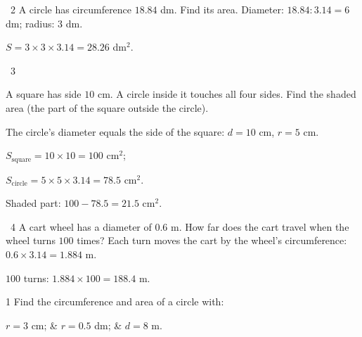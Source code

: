 \gap
\begin{exbox}{\ExWord\ 2}
A circle has circumference $18.84$ dm. Find its area.
\guide
Diameter: $18.84:3.14=6$ dm; radius: $3$ dm.\par $S=3\times3\times3.14=28.26$ dm$^2$.
\end{exbox}
\gap
\begin{exbox}{\ExWord\ 3}
\begin{minipage}[t]{0.66\linewidth}
A square has side $10$ cm. A circle inside it touches all four sides. Find the shaded area (the part of the square outside the circle).
\end{minipage}\hfill
\begin{minipage}[t]{0.3\linewidth}\vspace{0pt}\centering
{}
\end{minipage}
\guide
The circle's diameter equals the side of the square: $d=10$ cm, $r=5$ cm.\par
$S_\text{square}=10\times10=100$ cm$^2$;\par $S_\text{circle}=5\times5\times3.14=78.5$ cm$^2$.\par
Shaded part: $100-78.5=21.5$ cm$^2$.
\end{exbox}
\gap
\begin{exbox}{\ExWord\ 4}
A cart wheel has a diameter of $0.6$ m. How far does the cart travel when the wheel turns $100$ times?
\guide
Each turn moves the cart by the wheel's circumference: $0.6\times3.14=1.884$ m.\par
$100$ turns: $1.884\times100=188.4$ m.
\end{exbox}
\begin{probbox}{1}{\relax}
Find the circumference and area of a circle with:
\begin{cols3}
 $r=3$ cm; &  $r=0.5$ dm; &  $d=8$ m.
\end{cols3}
\end{probbox}
